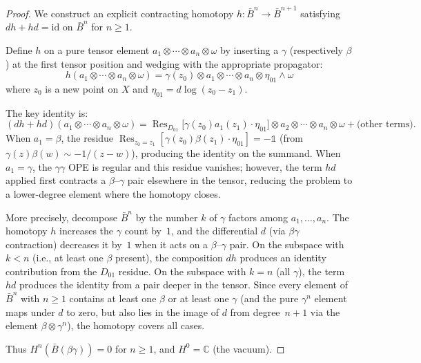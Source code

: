 \begin{proof}
We construct an explicit contracting homotopy
$h: \bar{B}^n \to \bar{B}^{n+1}$ satisfying $dh + hd = \mathrm{id}$
on $\bar{B}^{n}$ for $n \geq 1$.

Define $h$ on a pure tensor element
$a_1 \otimes \cdots \otimes a_n \otimes \omega$ by inserting a
$\gamma$ (respectively $\beta$) at the first tensor position and
wedging with the appropriate propagator:
\begin{equation}\label{eq:contracting-homotopy}
h(a_1 \otimes \cdots \otimes a_n \otimes \omega)
= \gamma(z_0) \otimes a_1 \otimes \cdots \otimes a_n
\otimes \eta_{01} \wedge \omega
\end{equation}
where $z_0$ is a new point on $X$ and $\eta_{01} = d\log(z_0 - z_1)$.

The key identity is:
\[
(dh + hd)(a_1 \otimes \cdots \otimes a_n \otimes \omega)
= \operatorname{Res}_{D_{01}}
\bigl[\gamma(z_0) a_1(z_1) \cdot \eta_{01}\bigr]
\otimes a_2 \otimes \cdots \otimes a_n \otimes \omega
+ \text{(other terms)}.
\]
When $a_1 = \beta$, the residue
$\operatorname{Res}_{z_0 = z_1}[\gamma(z_0)\beta(z_1) \cdot
\eta_{01}] = -\mathbb{1}$ (from $\gamma(z)\beta(w) \sim -1/(z-w)$),
producing the identity on the summand.  When $a_1 = \gamma$, the
$\gamma\gamma$ OPE is regular and this residue vanishes; however,
the term $hd$ applied first contracts a $\beta$--$\gamma$ pair
elsewhere in the tensor, reducing the problem to a lower-degree
element where the homotopy closes.

More precisely, decompose $\bar{B}^n$ by the number $k$ of $\gamma$
factors among $a_1, \ldots, a_n$.  The homotopy $h$ increases the
$\gamma$ count by~$1$, and the differential $d$ (via
$\beta\gamma$ contraction) decreases it by~$1$ when it acts on a
$\beta$--$\gamma$ pair.  On the subspace with $k < n$ (i.e.,
at least one $\beta$ present), the composition $dh$ produces an
identity contribution from the $D_{01}$ residue.  On the subspace
with $k = n$ (all $\gamma$), the term $hd$ produces the identity
from a pair deeper in the tensor.  Since every element of
$\bar{B}^n$ with $n \geq 1$ contains at least one $\beta$ or at
least one $\gamma$ (and the pure $\gamma^n$ element maps under $d$
to zero, but also lies in the image of $d$ from degree~$n+1$ via
the element $\beta \otimes \gamma^n$), the homotopy covers all
cases.

Thus $H^n(\bar{B}(\beta\gamma)) = 0$ for $n \geq 1$, and
$H^0 = \mathbb{C}$ (the vacuum).
\end{proof}


